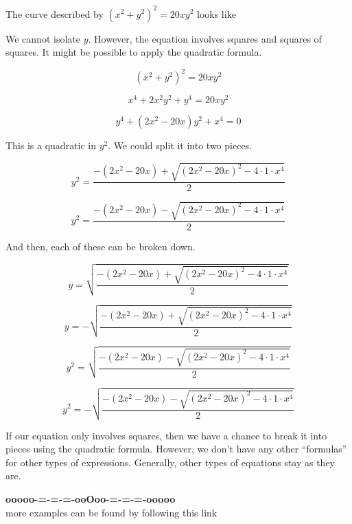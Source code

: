 \documentclass{ximera}
\begin{document}
\begin{example}


The curve described by $(x^2 + y^2)^2 = 20 x y^2$ looks like



\begin{center}
\end{center}


We cannot isolate $y$.  However, the equation involves squares and squares of squares.  It might be possible to apply the quadratic formula.


\[ (x^2 + y^2)^2 = 20 x y^2  \]

\[ x^4 + 2 x^2 y^2 + y^4 = 20 x y^2  \]

\[ y^4 + (2 x^2 - 20 x) y^2 + x^4 = 0 \]




This is a quadratic in $y^2$.  We could split it into two pieces.  



\[ y^2 = \frac{-(2 x^2 - 20 x) + \sqrt{(2x^2-20x)^2 - 4 \cdot 1 \cdot x^4}}{2}   \]


\[ y^2 = \frac{-(2 x^2 - 20 x) - \sqrt{(2x^2-20x)^2 - 4 \cdot 1 \cdot x^4}}{2}   \]



And then, each of these can be broken down.




\[ y = \sqrt{\frac{-(2 x^2 - 20 x) + \sqrt{(2x^2-20x)^2 - 4 \cdot 1 \cdot x^4}}{2}}   \]


\[ y = -\sqrt{\frac{-(2 x^2 - 20 x) + \sqrt{(2x^2-20x)^2 - 4 \cdot 1 \cdot x^4}}{2}}   \]



\[ y^2 = \sqrt{\frac{-(2 x^2 - 20 x) - \sqrt{(2x^2-20x)^2 - 4 \cdot 1 \cdot x^4}}{2}}   \]


\[ y^2 = -\sqrt{\frac{-(2 x^2 - 20 x) - \sqrt{(2x^2-20x)^2 - 4 \cdot 1 \cdot x^4}}{2}}   \]





\begin{center}
\end{center}


If our equation only involves squares, then we have a chance to break it into pieces using the quadratic formula.  However, we don't have any other ``formulas'' for other types of expressions.  Generally, other types of equations stay as they are.


\end{example}





















\begin{center}
\textbf{\textcolor{green!50!black}{ooooo-=-=-=-ooOoo-=-=-=-ooooo}} \\

more examples can be found by following this link\\ 

\end{center}
\end{document}
